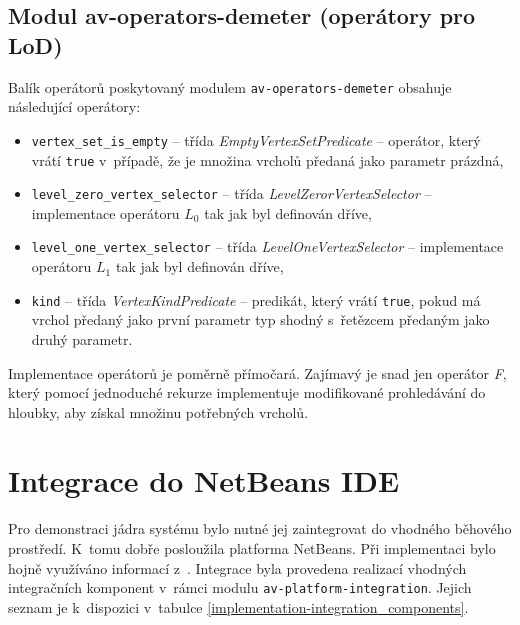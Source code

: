 \subsection{Modul av-operators-demeter (operátory pro LoD)}
Balík operátorů poskytovaný modulem \verb+av-operators-demeter+ obsahuje následující operátory:

\begin{itemize}
\item \verb+vertex_set_is_empty+ -- třída \emph{EmptyVertexSetPredicate} -- operátor, který vrátí \verb+true+ v~případě, že je množina vrcholů předaná jako parametr prázdná,
\item \verb+level_zero_vertex_selector+ -- třída \emph{LevelZerorVertexSelector} -- implementace operátoru $L_0$ tak jak byl definován dříve,
\item \verb+level_one_vertex_selector+ -- třída \emph{LevelOneVertexSelector} -- implementace operátoru $L_1$ tak jak byl definován dříve,
\item \verb+kind+ -- třída \emph{VertexKindPredicate} -- predikát, který vrátí \verb+true+, pokud má vrchol předaný jako první parametr typ shodný s~řetězcem předaným jako druhý parametr.
\end{itemize}

Implementace operátorů je poměrně přímočará. Zajímavý je snad jen operátor \emph{F}, který pomocí jednoduché rekurze implementuje modifikované prohledávání do hloubky, aby získal množinu potřebných vrcholů.

\section{Integrace do NetBeans IDE}

Pro demonstraci jádra systému bylo nutné jej zaintegrovat do vhodného běhového prostředí. K~tomu dobře posloužila platforma NetBeans. Při implementaci bylo hojně využíváno informací z~\cite{netbeans_platform}. Integrace byla provedena realizací vhodných integračních komponent v~rámci modulu \verb+av-platform-integration+. Jejich seznam je k~dispozici v~tabulce \ref{implementation-integration_components}.


